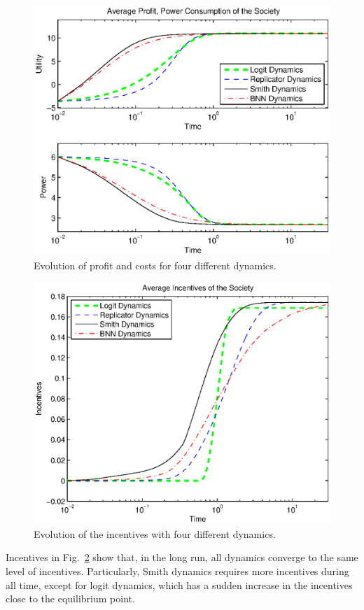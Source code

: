\documentclass[a4paper,10pt]{article}
\begin{document}
\begin{figure}[hbt]
 \centering
 \includegraphics[width=.75\textwidth]{./images/evolution_u.eps}
 \caption{Evolution of profit and costs for four different dynamics.}
 \label{fig:dynamics_u}
\end{figure}


\begin{figure}[hbt]
 \centering
 \includegraphics[width=.75\textwidth]{./images/evolution_i.eps}
 \caption{Evolution of the incentives with four different dynamics.}
 \label{fig:dynamics_i}
\end{figure}



Incentives in Fig.~\ref{fig:dynamics_i} show that, in the long run, all dynamics converge to the same level of incentives. Particularly, Smith dynamics requires more incentives during all time, except for logit dynamics, which has a sudden increase in the incentives close to the equilibrium point. 
\end{document}
